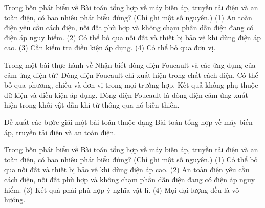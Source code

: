 \begin{ex}
Trong bốn phát biểu về Bài toán tổng hợp về máy biến áp, truyền tải điện và an toàn điện, có bao nhiêu phát biểu đúng? (Chỉ ghi một số nguyên.) (1) An toàn điện yêu cầu cách điện, nối đất phù hợp và không chạm phần dẫn điện đang có điện áp nguy hiểm. (2) Có thể bỏ qua nối đất và thiết bị bảo vệ khi dùng điện áp cao. (3) Cần kiểm tra điều kiện áp dụng. (4) Có thể bỏ qua đơn vị.
\end{ex}

\begin{ex}
Trong một bài thực hành về Nhận biết dòng điện Foucault và các ứng dụng của cảm ứng điện từ?
\choice
{Dòng điện Foucault chỉ xuất hiện trong chất cách điện.}
{Có thể bỏ qua phương, chiều và đơn vị trong mọi trường hợp.}
{Kết quả không phụ thuộc dữ kiện và điều kiện áp dụng.}
{\True Dòng điện Foucault là dòng điện cảm ứng xuất hiện trong khối vật dẫn khi từ thông qua nó biến thiên.}
\end{ex}

\begin{bt}
Đề xuất các bước giải một bài toán thuộc dạng Bài toán tổng hợp về máy biến áp, truyền tải điện và an toàn điện.
\end{bt}

\begin{ex}
Trong bốn phát biểu về Bài toán tổng hợp về máy biến áp, truyền tải điện và an toàn điện, có bao nhiêu phát biểu đúng? (Chỉ ghi một số nguyên.) (1) Có thể bỏ qua nối đất và thiết bị bảo vệ khi dùng điện áp cao. (2) An toàn điện yêu cầu cách điện, nối đất phù hợp và không chạm phần dẫn điện đang có điện áp nguy hiểm. (3) Kết quả phải phù hợp ý nghĩa vật lí. (4) Mọi đại lượng đều là vô hướng.
\end{ex}

